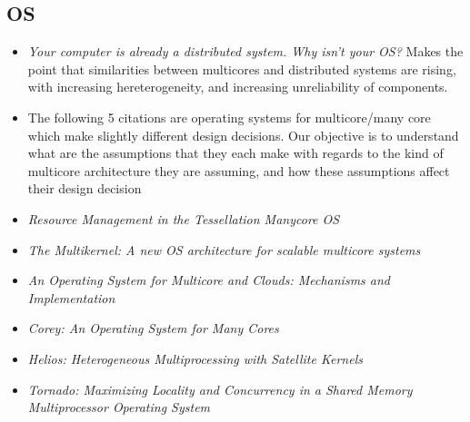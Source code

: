 \subsection{OS}
\begin{itemize}
\item \emph{Your computer is already a distributed system. Why isn't your OS?} \cite{baumann2009your}
Makes the point that similarities between multicores and distributed systems are 
rising, with increasing hereterogeneity, and increasing unreliability of components.
\item The following 5 citations are operating systems for multicore/many core which make slightly different design decisions. Our objective is to understand what are the assumptions that they each make with regards to the kind of multicore architecture they are assuming, and how these assumptions affect their design decision
\item \emph{Resource Management in the Tessellation Manycore OS} \cite{colmenares2010resource}
\item \emph{The Multikernel: A new OS architecture for scalable multicore systems} \cite{Baumann:2009:MNO:1629575.1629579}
\item \emph{An Operating System for Multicore and Clouds: Mechanisms and Implementation} \cite{Wentzlaff:2010:OSM:1807128.1807132}
\item \emph{Corey: An Operating System for Many Cores} \cite{boyd2008corey}
\item \emph{Helios: Heterogeneous Multiprocessing with Satellite Kernels} \cite{Nightingale:2009:HHM:1629575.1629597}
\item \emph{Tornado: Maximizing Locality and Concurrency in a Shared
Memory Multiprocessor Operating System} \cite{gamsa1999tornado}


\end{itemize}
